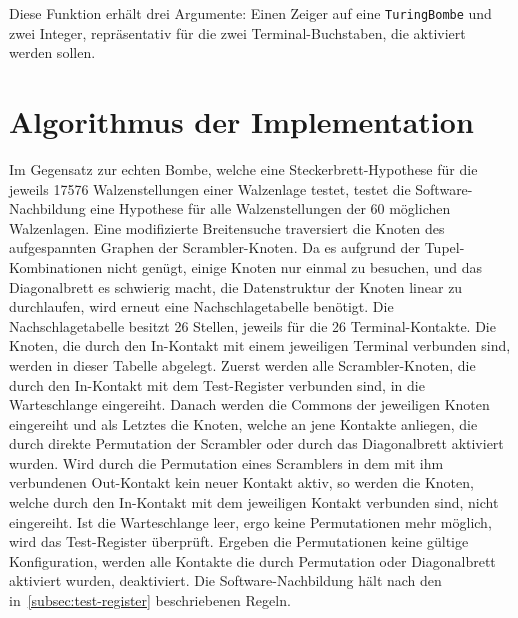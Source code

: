 Diese Funktion erhält drei Argumente: Einen Zeiger auf eine \texttt{TuringBombe} und zwei Integer, repräsentativ für die zwei Terminal-Buchstaben, die aktiviert werden sollen.

\chapter{Algorithmus der Implementation}\label{sec:algorithm_bombe}
Im Gegensatz zur \glqq echten\grqq{} Bombe, welche eine Steckerbrett-Hypothese für die jeweils 17576 Walzenstellungen einer Walzenlage testet, testet die Software-Nachbildung eine Hypothese für alle Walzenstellungen der 60 möglichen Walzenlagen.
Eine modifizierte Breitensuche traversiert die Knoten des aufgespannten Graphen der \glqq Scrambler-Knoten\grqq.
Da es aufgrund der Tupel-Kombinationen nicht genügt, einige Knoten nur einmal zu besuchen, und das Diagonalbrett es schwierig macht, die Datenstruktur der Knoten linear zu durchlaufen, wird erneut eine \glqq Nachschlagetabelle\grqq{} benötigt.
Die Nachschlagetabelle besitzt 26 Stellen, jeweils für die 26 Terminal-Kontakte.
Die Knoten, die durch den In-Kontakt mit einem jeweiligen Terminal verbunden sind, werden in dieser Tabelle abgelegt.
Zuerst werden alle Scrambler-Knoten, die durch den In-Kontakt mit dem Test-Register verbunden sind, in die Warteschlange eingereiht. 
Danach werden die Commons der jeweiligen Knoten eingereiht und als Letztes die Knoten, welche an jene Kontakte anliegen, die durch direkte Permutation der Scrambler oder durch das Diagonalbrett aktiviert wurden.
Wird durch die Permutation eines Scramblers in dem mit ihm verbundenen Out-Kontakt kein neuer Kontakt aktiv, so werden die Knoten, welche durch den In-Kontakt mit dem jeweiligen Kontakt verbunden sind, nicht eingereiht.
Ist die Warteschlange leer, ergo keine Permutationen mehr möglich, wird das Test-Register überprüft.
Ergeben die Permutationen keine gültige Konfiguration, werden alle Kontakte die durch Permutation oder Diagonalbrett aktiviert wurden, deaktiviert. 
Die Software-Nachbildung hält nach den in~\cref{subsec:test-register} beschriebenen Regeln.
